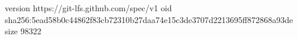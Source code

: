 version https://git-lfs.github.com/spec/v1
oid sha256:5ead58b0c44862f83cb72310b27daa74e15c3de3707d2213695ff872868a93de
size 98322
